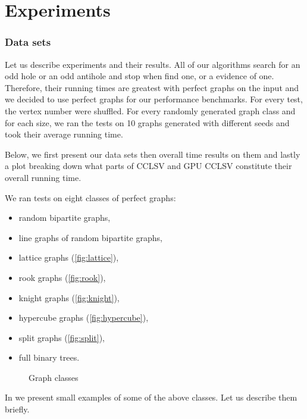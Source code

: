 \section{Experiments}
\label{sec:experiments}

\subsubsection{Data sets}

Let us describe experiments and their results. All of our algorithms search for an odd hole or an odd antihole and stop when find one, or a evidence of one. Therefore, their running times are greatest with perfect graphs on the input and we decided to use perfect graphs for our performance benchmarks. For every test, the vertex number were shuffled. For every randomly generated graph class and for each size, we ran the tests on 10 graphs generated with different seeds and took their average running time.

Below, we first present our data sets then overall time results on them and lastly a plot breaking down what parts of CCLSV and GPU CCLSV constitute their overall running time.

We ran tests on eight classes of perfect graphs:
\begin{itemize}
  \item random bipartite graphs,
  \item line graphs of random bipartite graphs,
  \item lattice graphs (\cref{fig:lattice}),
  \item rook graphs (\cref{fig:rook}),
  \item knight graphs (\cref{fig:knight}),
  \item hypercube graphs (\cref{fig:hypercube}),
  \item split graphs (\cref{fig:split}),
  \item full binary trees.
\end{itemize}


\begin{figure}
  
  \caption{Graph classes}
  \label{fig:graphClasses}
\end{figure}

In  we present small examples of some of the above classes. Let us describe them briefly.

